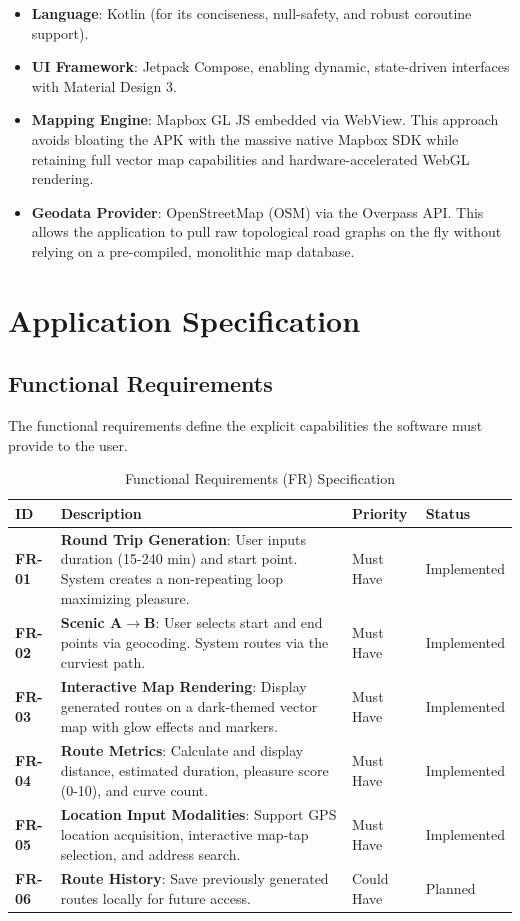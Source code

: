 \documentclass[12pt,a4paper,oneside]{report}
\begin{document}
\begin{itemize}
    \item \textbf{Language}: Kotlin (for its conciseness, null-safety, and robust coroutine support).
    \item \textbf{UI Framework}: Jetpack Compose, enabling dynamic, state-driven interfaces with Material Design 3.
    \item \textbf{Mapping Engine}: Mapbox GL JS embedded via WebView. This approach avoids bloating the APK with the massive native Mapbox SDK while retaining full vector map capabilities and hardware-accelerated WebGL rendering.
    \item \textbf{Geodata Provider}: OpenStreetMap (OSM) via the Overpass API. This allows the application to pull raw topological road graphs on the fly without relying on a pre-compiled, monolithic map database.
\end{itemize}

\chapter{Application Specification}

\section{Functional Requirements}
The functional requirements define the explicit capabilities the software must provide to the user.

\begin{table}[h]
\centering
\caption{Functional Requirements (FR) Specification}
\vspace{0.2cm}
\begin{tabularx}{\textwidth}{|l|X|l|l|}
\hline
\textbf{ID} & \textbf{Description} & \textbf{Priority} & \textbf{Status} \\ \hline
\textbf{FR-01} & \textbf{Round Trip Generation}: User inputs duration (15-240 min) and start point. System creates a non-repeating loop maximizing pleasure. & Must Have & Implemented \\ \hline
\textbf{FR-02} & \textbf{Scenic A$\rightarrow$B}: User selects start and end points via geocoding. System routes via the curviest path. & Must Have & Implemented \\ \hline
\textbf{FR-03} & \textbf{Interactive Map Rendering}: Display generated routes on a dark-themed vector map with glow effects and markers. & Must Have & Implemented \\ \hline
\textbf{FR-04} & \textbf{Route Metrics}: Calculate and display distance, estimated duration, pleasure score (0-10), and curve count. & Must Have & Implemented \\ \hline
\textbf{FR-05} & \textbf{Location Input Modalities}: Support GPS location acquisition, interactive map-tap selection, and address search. & Must Have & Implemented \\ \hline
\textbf{FR-06} & \textbf{Route History}: Save previously generated routes locally for future access. & Could Have & Planned \\ \hline
\end{tabularx}
\end{table}
\end{document}

